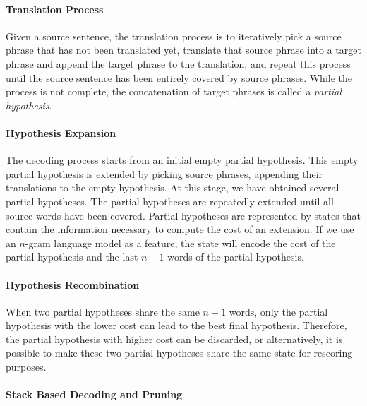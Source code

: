 \paragraph{Translation Process}

Given a source sentence, the translation process is to iteratively
pick a source phrase that has not been translated yet,
translate that source phrase into a target phrase
and append the target phrase to the translation, and repeat this
process until the source
sentence has been entirely covered by source phrases. While the process is not
complete, the concatenation of target phrases is called a
\emph{partial hypothesis}.

\paragraph{Hypothesis Expansion}

The decoding process starts from an initial empty partial hypothesis.
This empty partial hypothesis is extended by picking source phrases,
appending their translations to the empty hypothesis.
At this stage, we have obtained several partial hypotheses.
The partial hypotheses are repeatedly extended until
all source words have been covered.
Partial hypotheses are represented by states
that contain the information necessary to
compute the cost of an extension.
If we use an $n$-gram language model as a feature,
the state will encode the cost of the partial hypothesis
and the last $n - 1$ words of the partial hypothesis.

\paragraph{Hypothesis Recombination}
\label{sec:phraseBasedHypothesisRecombination}

When two partial hypotheses share the same $n - 1$
words, only the partial hypothesis with the lower
cost can lead to the best final hypothesis. Therefore,
the partial hypothesis with higher cost can be discarded, or
alternatively, it is possible to make these two partial
hypotheses share the same state for rescoring purposes.

\paragraph{Stack Based Decoding and Pruning}
\label{sec:phraseBasedPruning}

